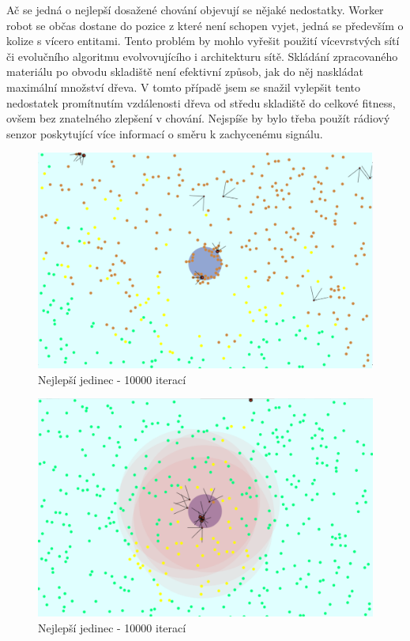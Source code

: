	Ač se jedná o nejlepší dosažené chování objevují se nějaké nedostatky. Worker robot se občas dostane do pozice z které není schopen vyjet, jedná se především o kolize s vícero entitami. Tento problém by mohlo vyřešit použití vícevrstvých sítí či evolučního algoritmu evolvovujícího i architekturu sítě. Skládání zpracovaného materiálu po obvodu skladiště není efektivní způsob, jak do něj naskládat maximální množství dřeva. V tomto případě jsem se snažil vylepšit tento nedostatek promítnutím vzdálenosti dřeva od středu skladiště do celkové fitness, ovšem bez znatelného zlepšení v chování. Nejspíše by bylo třeba použít rádiový senzor poskytující více informací o směru k zachycenému signálu. 
	\newpage 
	\begin{figure}[p]\centering
		\includegraphics[width=\columnwidth]{../img/WoodMap/pictures/end.png}
		\caption{Nejlepší jedinec - 10000 iterací}
		\label{obr04:bestEnd}
	\end{figure}
	\begin{figure}[p]\centering
		\includegraphics[width=\columnwidth]{../img/WoodMap/pictures/EndRandom.png}
		\caption{Nejlepší jedinec - 10000 iterací}
		\label{obr04:randomEnd}
	\end{figure}
